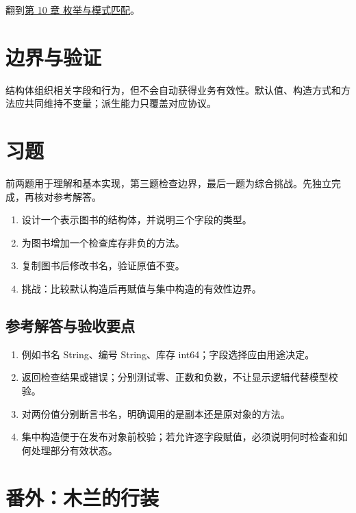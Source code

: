 翻到\hyperref[ch:10]{第 10 章 枚举与模式匹配}。

\section{边界与验证}

结构体组织相关字段和行为，但不会自动获得业务有效性。默认值、构造方式和方法应共同维持不变量；派生能力只覆盖对应协议。

\section{习题}

前两题用于理解和基本实现，第三题检查边界，最后一题为综合挑战。先独立完成，再核对参考解答。

\begin{enumerate}

\item 设计一个表示图书的结构体，并说明三个字段的类型。

\item 为图书增加一个检查库存非负的方法。

\item 复制图书后修改书名，验证原值不变。

\item 挑战：比较默认构造后再赋值与集中构造的有效性边界。

\end{enumerate}

\subsection*{参考解答与验收要点}

\begin{enumerate}

\item 例如书名 String、编号 String、库存 int64；字段选择应由用途决定。

\item 返回检查结果或错误；分别测试零、正数和负数，不让显示逻辑代替模型校验。

\item 对两份值分别断言书名，明确调用的是副本还是原对象的方法。

\item 集中构造便于在发布对象前校验；若允许逐字段赋值，必须说明何时检查和如何处理部分有效状态。

\end{enumerate}

\section{番外：木兰的行装}

